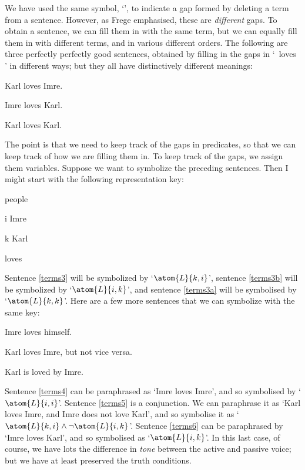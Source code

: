 We have used the same symbol, `\blank', to indicate a gap formed by deleting a term from a sentence. However, as Frege emphasised, these are \emph{different} gaps. To obtain a sentence, we can fill them in with the same term, but we can equally fill them in with different terms, and in various different orders. The following are three perfectly perfectly good sentences, obtained by filling in the gaps in `\blank\ loves \blank{}' in different ways; but they all have distinctively different meanings:
\begin{earg}
	\item[\ex{terms3}] Karl loves Imre.
	\item[\ex{terms3b}] Imre loves Karl.
	\item[\ex{terms3a}] Karl loves Karl.
\end{earg}
The point is that we need to keep track of the gaps in predicates, so that we can keep track of how we are filling them in. To keep track of the gaps, we assign them variables. Suppose we want to symbolize the preceding sentences. Then I might start with the following representation key: 
	\begin{ekey}
		\item[\text{domain}] people
		\item[i] Imre
		\item[k] Karl
		\item[\atom{L}{x,y}]  loves 
	\end{ekey}
 Sentence \ref{terms3} will be symbolized by `$\atom{L}{k,i}$', sentence \ref{terms3b} will be symbolized by `$\atom{L}{i,k}$', and sentence \ref{terms3a} will be symbolised by `$\atom{L}{k,k}$'. Here are a few more sentences that we can symbolize with the same key:
\begin{earg}
	\item[\ex{terms4}] Imre loves himself.
	\item[\ex{terms5}] Karl loves Imre, but not vice versa.
	\item[\ex{terms6}] Karl is loved by Imre.
\end{earg}
Sentence \ref{terms4} can be paraphrased as `Imre loves Imre', and so symbolised by `$\atom{L}{i,i}$'. Sentence \ref{terms5} is a conjunction. We can paraphrase it as `Karl loves Imre, and Imre does not love Karl', and so symbolise it as `$\atom{L}{k,i} \eand \enot \atom{L}{i,k}$'. Sentence \ref{terms6} can be paraphrased by `Imre loves Karl', and so symbolised as `$\atom{L}{i,k}$'. In this last case, of course, we have lots the difference in \emph{tone} between the active and passive voice; but we have at least preserved the truth conditions.

